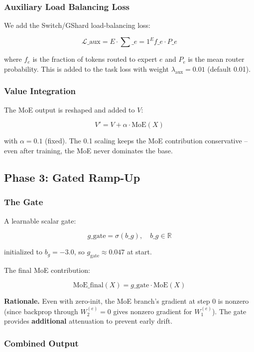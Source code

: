 \subsubsection{Auxiliary Load Balancing Loss}

We add the Switch/GShard load-balancing loss:

\[
\mathcal{L}\_\text{aux} = E \cdot \sum\_{e=1}^{E} f\_e \cdot P\_e
\]

where $f_e$ is the fraction of tokens routed to expert $e$ and $P_e$ is 
the mean router probability. This is added to the task loss with weight 
$\lambda_\text{aux} = 0.01$ (default 0.01).

\subsubsection{Value Integration}

The MoE output is reshaped and added to $V$:

\[
V' = V + \alpha \cdot \text{MoE}(X)
\]

with $\alpha = 0.1$ (fixed). The 0.1 scaling keeps the MoE contribution 
conservative -- even after training, the MoE never dominates the base.

\subsection{Phase 3: Gated Ramp-Up}

\subsubsection{The Gate}

A learnable scalar gate:

\[
g\_\text{gate} = \sigma(b\_g), \quad b\_g \in \mathbb{R}
\]

initialized to $b_g = -3.0$, so $g_\text{gate} \approx 0.047$ at start.

The final MoE contribution:

\[
\text{MoE}\_\text{final}(X) = g\_\text{gate} \cdot \text{MoE}(X)
\]

\textbf{Rationale.} Even with zero-init, the MoE branch's gradient at step 0 is 
nonzero (since backprop through $W_2^{(e)} = 0$ gives nonzero gradient for 
$W_1^{(e)}$). The gate provides \textbf{additional} attenuation to prevent early 
drift.

\subsubsection{Combined Output}

